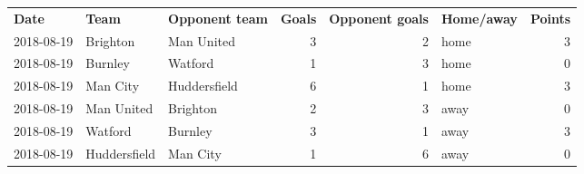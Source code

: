 \begin{tabular}{lllrrlr}
\textbf{Date} & \textbf{Team} & \textbf{Opponent team} & \multicolumn{1}{l}{\textbf{Goals}} & \multicolumn{1}{l}{\textbf{Opponent goals}} & \textbf{Home/away} & \multicolumn{1}{l}{\textbf{Points}}  \\
  2018-08-19 & Brighton & Man United & 3     & 2     & home  & 3     \\
  2018-08-19 & Burnley & Watford & 1     & 3     & home  & 0     \\
  2018-08-19 & Man City & Huddersfield & 6     & 1     & home  & 3  \\
  2018-08-19 & Man United & Brighton & 2     & 3     & away  & 0 \\
  2018-08-19 & Watford & Burnley & 3     & 1     & away  & 3  \\
  2018-08-19 & Huddersfield & Man City & 1     & 6     & away  & 0 \\
\end{tabular}%
